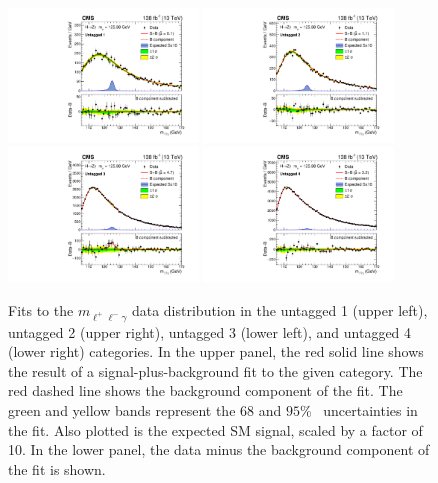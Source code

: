   \begin{figure}
  \centering
  \includegraphics[width=0.45\textwidth]{fig/results/Figure_006-a.pdf}
  \includegraphics[width=0.45\textwidth]{fig/results/Figure_006-b.pdf}\\
  \includegraphics[width=0.45\textwidth]{fig/results/Figure_006-c.pdf}
  \includegraphics[width=0.45\textwidth]{fig/results/Figure_006-d.pdf}
   \caption{Fits to the $m_{\ell^+\ell^-\gamma}$ data distribution
    in the untagged 1 (upper left), untagged 2 (upper right), untagged 3 (lower left), and
  untagged 4 (lower right) categories.
  In the upper panel, the red solid line shows the result of a signal-plus-background fit to the given category.
  The red dashed line shows the background component of the fit.
  The green and yellow bands represent the $68$ and $95$\% \CL\ uncertainties in the fit.
  Also plotted is the expected SM signal, scaled by a factor of 10.
  In the lower panel, the data minus the background component of the fit is shown. \label{fig:4}}
  \end{figure}

